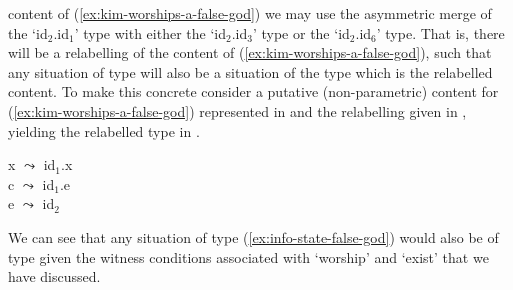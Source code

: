 content of
(\ref{ex:kim-worships-a-false-god}) we may use the asymmetric
merge of the `id$_2$.id$_1$' type with either the `id$_2$.id$_3$' type or the
`id$_2$.id$_6$' type.  That is, there will be a relabelling of the content of
(\ref{ex:kim-worships-a-false-god}), such that any situation of type
\preveg{} will also be a situation of the type which is the relabelled
content.  To make this concrete consider a putative (non-parametric) content
for (\ref{ex:kim-worships-a-false-god}) represented in  and
the relabelling given in , yielding the relabelled type in .
\begin{ex} 
\begin{subex} 
 
\item {} 
 
\item x $\leadsto$ id$_1$.x\\
      c $\leadsto$ id$_1$.e\\
      e $\leadsto$ id$_2$ 

\item {}
 
\end{subex} 
   
\end{ex} 
We can see that any situation of type (\ref{ex:info-state-false-god})
would also be of type  given the witness conditions
associated with `worship' and `exist' that we have discussed.

